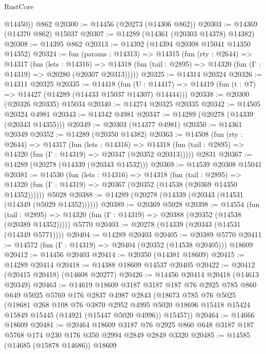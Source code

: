 \begin{lexlean}{RustCore}
\begin{coremodule}
        @14450))
    @862
@20300 := @14456 (@20273 (@14306 @862))
@20303 := @14369 (@14370 @862) @15037
@20307 := @14289 (@14361 (@20303 @14378) @14382)
@20308 := @14395 @862
@20313 := @14392 (@14394 @20308 @15041 @14350 @14352)
@20324 := fun (params : @14313) =>
  @14315
    (fun (rty : @2644) =>
    @14317
      (fun (lets : @14316) =>
      @14318 (fun (tail : @2895) => @14320 (fun (Γ : @14319) => @20280 (@20307 @20313)))))
@20325 := @14314 @20324
@20326 := @14311 @20325
@20335 := @14418
    (fun (U : @14417) => @14419 (fun (t : @7) => @14427 (@14289 (@14433 @15037 @14307) @14444)))
@20338 := @20300 (@20326 @20335) @15034
@20340 := @14274 @20325 @20335
@20342 := @14505 @20324 @4981
@20343 := @14342 @4981
@20347 := @14289 (@20278 (@14339 (@20343 @14355)))
@20349 := @20303 (@14377 @4981)
@20350 := @14361 @20349
@20352 := @14289 (@20350 @14382)
@20363 := @14508
    (fun (rty : @2644) =>
    @14317
      (fun (lets : @14316) =>
      @14318 (fun (tail : @2895) => @14320 (fun (Γ : @14319) => @20347 (@20352 @20313)))))
    @2831
@20367 := @14289 (@20278 (@14339 (@20343 @14532)))
@20369 := @14539 @20308 @15041
@20381 := @14530
    (fun (lets : @14316) =>
    @14318
      (fun (tail : @2895) =>
      @14320 (fun (Γ : @14319) => @20367 (@20352 (@14538 (@20369 @14350 @14352))))))
    @5028
@20388 := @14289 (@20278 (@14339 (@20343 (@14531 (@14349 (@5029 @14352))))))
@20389 := @20369 @5028
@20398 := @14554
    (fun (tail : @2895) => @14320 (fun (Γ : @14319) => @20388 (@20352 (@14538 (@20389 @14352)))))
    @5770
@20403 := @20278 (@14339 (@20343 (@14531 (@14349 @5771))))
@20404 := @14289 @20403
@20405 := @20389 @5770
@20411 := @14572 (fun (Γ : @14319) => @20404 (@20352 (@14538 @20405))) @18609
@20412 := @14456 @20403
@20414 := @20350 (@14381 @18609)
@20415 := @14289 @20414
@20418 := @14388 @18609 @14537 @20405
@20422 := @20412 (@20415 @20418) (@14608 @20277)
@20426 := @14456 @20414 @20418 (@14613 @20349)
@20463 := @14619
    @18609
    @3187
    @3187
    @187
    @76
    @2925
    @785
    @860
    @649
    @5025
    @5769
    @176
    @2837
    @4987
    @2843
    (@18673
      @785
      @76
      @5025
      (@18681
        @268
        @108
        @76
        @3870
        @2952
        @4995
        @5020
        @18696
        @15418
        @15424
        @15849
        @15445
        (@14921 (@15447 @5020 @4996))
        @15457))
@20464 := @14666 @18609
@20481 := @20464
    @18609
    @3187
    @76
    @2925
    @860
    @648
    @3187
    @187
    @5768
    @174
    @230
    @176
    @350
    @2994
    @2849
    @2849
    @3320
@20485 := @14585 (@14685 (@15878 @14686)) @18609

\end{coremodule}
\end{lexlean}
